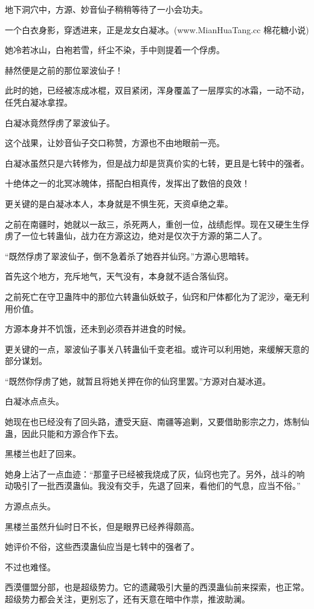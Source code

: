 \begin{this_body}
地下洞穴中，方源、妙音仙子稍稍等待了一小会功夫。

一个白衣身影，穿透进来，正是龙女白凝冰。(www.MianHuaTang.cc 棉花糖小说)

她冷若冰山，白袍若雪，纤尘不染，手中则提着一个俘虏。

赫然便是之前的那位翠波仙子！

此时的她，已经被冻成冰棍，双目紧闭，浑身覆盖了一层厚实的冰霜，一动不动，任凭白凝冰拿捏。

白凝冰竟然俘虏了翠波仙子。

这个战果，让妙音仙子交口称赞，方源也不由地眼前一亮。

白凝冰虽然只是六转修为，但是战力却是货真价实的七转，更且是七转中的强者。

十绝体之一的北冥冰魄体，搭配白相真传，发挥出了数倍的良效！

更关键的是白凝冰本人，本身就是不惧生死，天资卓绝之辈。

之前在南疆时，她就以一敌三，杀死两人，重创一位，战绩彪悍。现在又硬生生俘虏了一位七转蛊仙，战力在方源这边，绝对是仅次于方源的第二人了。

“既然俘虏了翠波仙子，倒不急着杀了她吞并仙窍。”方源心思暗转。

首先这个地方，充斥地气，天气没有，本身就不适合落仙窍。

之前死亡在守卫蛊阵中的那位六转蛊仙妖蚊子，仙窍和尸体都化为了泥沙，毫无利用价值。

方源本身并不饥饿，还未到必须吞并进食的时候。

更关键的一点，翠波仙子事关八转蛊仙千变老祖。或许可以利用她，来缓解天意的部分谋划。

“既然你俘虏了她，就暂且将她关押在你的仙窍里罢。”方源对白凝冰道。

白凝冰点点头。

她现在也已经没有了回头路，遭受天庭、南疆等追剿，又要借助影宗之力，炼制仙蛊，因此只能和方源合作下去。

黑楼兰也赶了回来。

她身上沾了一点血迹：“那童子已经被我烧成了灰，仙窍也完了。另外，战斗的响动吸引了一批西漠蛊仙。我没有交手，先退了回来，看他们的气息，应当不俗。”

方源点点头。

黑楼兰虽然升仙时日不长，但是眼界已经养得颇高。

她评价不俗，这些西漠蛊仙应当是七转中的强者了。

不过也难怪。

西漠僵盟分部，也是超级势力。它的遗藏吸引大量的西漠蛊仙前来探索，也正常。超级势力都会关注，更别忘了，还有天意在暗中作祟，推波助澜。


\end{this_body}

